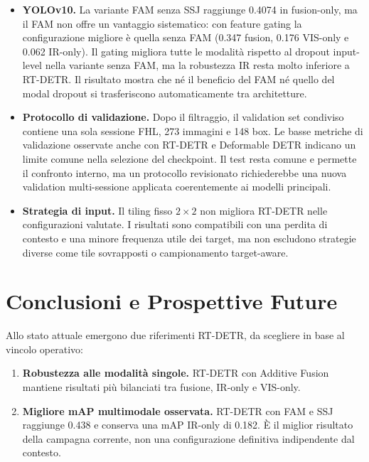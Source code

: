 \documentclass[a4paper,11pt]{article}
\begin{document}
\begin{itemize}
    \item \textbf{YOLOv10.}
    La variante FAM senza SSJ raggiunge 0.4074 in fusion-only, ma il FAM non offre un vantaggio sistematico: con feature gating la configurazione migliore è quella senza FAM (0.347 fusion, 0.176 VIS-only e 0.062 IR-only). Il gating migliora tutte le modalità rispetto al dropout input-level nella variante senza FAM, ma la robustezza IR resta molto inferiore a RT-DETR. Il risultato mostra che né il beneficio del FAM né quello del modal dropout si trasferiscono automaticamente tra architetture.

    \item \textbf{Protocollo di validazione.}
    Dopo il filtraggio, il validation set condiviso contiene una sola sessione FHL, 273 immagini e 148 box. Le basse metriche di validazione osservate anche con RT-DETR e Deformable DETR indicano un limite comune nella selezione del checkpoint. Il test resta comune e permette il confronto interno, ma un protocollo revisionato richiederebbe una nuova validation multi-sessione applicata coerentemente ai modelli principali.

    \item \textbf{Strategia di input.}
    Il tiling fisso $2\times2$ non migliora RT-DETR nelle configurazioni valutate. I risultati sono compatibili con una perdita di contesto e una minore frequenza utile dei target, ma non escludono strategie diverse come tile sovrapposti o campionamento target-aware.
\end{itemize}

\section{Conclusioni e Prospettive Future}

Allo stato attuale emergono due riferimenti RT-DETR, da scegliere in base al vincolo operativo:

\par\medskip
\begin{enumerate}
    \item \textbf{Robustezza alle modalità singole.} RT-DETR con Additive Fusion mantiene risultati più bilanciati tra fusione, IR-only e VIS-only.

    \item \textbf{Migliore mAP multimodale osservata.} RT-DETR con FAM e SSJ raggiunge 0.438 e conserva una mAP IR-only di 0.182. È il miglior risultato della campagna corrente, non una configurazione definitiva indipendente dal contesto.
\end{enumerate}
\end{document}
